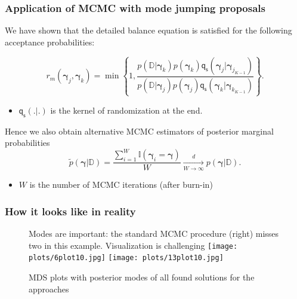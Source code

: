 \documentclass{beamer}
\begin{document}
\begin{frame}

\frametitle{Application of MCMC with mode jumping proposals}
We have shown that the detailed balance equation is satisfied for the following acceptance probabilities:

\begin{equation}
r_m(\boldsymbol{\gamma}_j,\boldsymbol{\gamma}_k) = \min\left\{1,\frac{p(\mathbb{D}|\boldsymbol{\gamma}_k)p(\boldsymbol{\gamma}_k)\mathsf{q_s}(\boldsymbol{\gamma}_j|\boldsymbol{\gamma}_{j_{K-1}})}{p(\mathbb{D}|\boldsymbol{\gamma}_j)p(\boldsymbol{\gamma}_j)\mathsf{q_s}(\boldsymbol{\gamma}_k|\boldsymbol{\gamma}_{k_{K-1}})}\right\}.\label{locmcmc3}
\end{equation}

\begin{itemize}
\item $\mathsf{q_s}(.|.)$ is the kernel of randomization at the end.
\end{itemize}

Hence we also obtain alternative MCMC estimators of posterior marginal probabilities
\begin{equation}\tilde{p}(\boldsymbol{\gamma}|\mathbb{D}) =  \frac{\sum_{i=1}^{W}{\mathbb{I}({\boldsymbol{\gamma}}_{i} = {\boldsymbol{\gamma}})}}{W} \xrightarrow[W\rightarrow\infty]{d} p(\boldsymbol{\gamma}|\mathbb{D}).
\end{equation}
\begin{itemize}
\item $W$ is the number of MCMC iterations (after burn-in)
\end{itemize}

\end{frame}

\begin{frame}
\frametitle{How it looks like in reality}
\begin{figure}
Modes are important: the standard MCMC procedure (right) misses two in this example. Visualization is challenging
\texttt{[image: plots/6plot10.jpg]}
\texttt{[image: plots/13plot10.jpg]}
\caption{MDS plots with posterior modes of all found solutions for the approaches}
\end{figure}

\end{frame}
\end{document}
